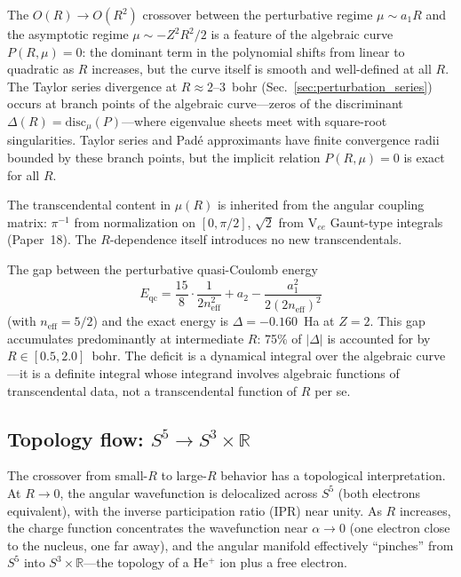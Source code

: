 \documentclass[aps,pra,twocolumn,superscriptaddress,longbibliography]{revtex4-2}
\begin{document}
The $O(R) \to O(R^2)$ crossover between the perturbative regime
$\mu \sim a_1 R$ and the asymptotic regime $\mu \sim -Z^2 R^2/2$ is a
feature of the algebraic curve $P(R,\mu) = 0$: the dominant term in the
polynomial shifts from linear to quadratic as $R$ increases, but the
curve itself is smooth and well-defined at all $R$.  The Taylor series
divergence at $R \approx 2$--$3$~bohr (Sec.~\ref{sec:perturbation_series})
occurs at branch points of the algebraic curve---zeros of the discriminant
$\Delta(R) = \mathrm{disc}_\mu(P)$---where eigenvalue sheets meet with
square-root singularities.  Taylor series and Pad\'e approximants have
finite convergence radii bounded by these branch points, but the implicit
relation $P(R,\mu) = 0$ is exact for all $R$.

The transcendental content in $\mu(R)$ is inherited from the angular
coupling matrix: $\pi^{-1}$ from normalization on $[0, \pi/2]$,
$\sqrt{2}$ from V$_{ee}$ Gaunt-type integrals (Paper~18).  The
$R$-dependence itself introduces no new transcendentals.

The gap between the perturbative quasi-Coulomb energy
\begin{equation}
  E_{\mathrm{qc}} = \frac{15}{8} \cdot \frac{1}{2n_{\mathrm{eff}}^2}
  + a_2 - \frac{a_1^2}{2(2n_{\mathrm{eff}})^2}
  \label{eq:E_qc}
\end{equation}
(with $n_{\mathrm{eff}} = 5/2$) and the exact energy is
$\Delta = -0.160$~Ha at $Z = 2$.  This gap accumulates
predominantly at intermediate $R$: 75\% of $|\Delta|$ is
accounted for by $R \in [0.5, 2.0]$~bohr.  The deficit is a
dynamical integral over the algebraic curve---it is a definite
integral whose integrand involves algebraic functions of
transcendental data, not a transcendental function of $R$
per se.

\subsection{Topology flow: $S^5 \to S^3 \times \mathbb{R}$}
\label{sec:topology_flow}

The crossover from small-$R$ to large-$R$ behavior has a
topological interpretation.  At $R \to 0$, the angular wavefunction
is delocalized across $S^5$ (both electrons equivalent), with
the inverse participation ratio (IPR) near unity.  As $R$
increases, the charge function concentrates the wavefunction near
$\alpha \to 0$ (one electron close to the nucleus, one far away),
and the angular manifold effectively ``pinches'' from $S^5$ into
$S^3 \times \mathbb{R}$---the topology of a He$^+$ ion plus a
free electron.
\end{document}
